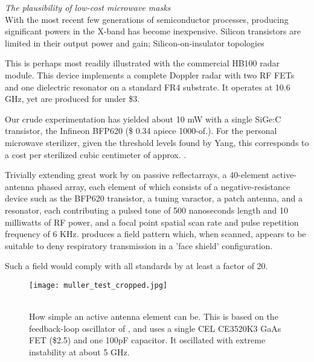 \documentclass[paper.tex]{subfiles}
\begin{document}
%
%
%
{\Large \it The plausibility of low-cost microwave masks}\\

With the most recent few generations of semiconductor processes, producing significant powers in the X-band has become inexpensive. Silicon transistors are limited in their output power and gain; Silicon-on-insulator topologies 

This is perhaps most readily illustrated with the commercial HB100 radar module. This device implements a complete Doppler radar with two RF FETs and one dielectric resonator on a standard FR4 substrate. It operates at 10.6 GHz, yet are produced for under \$3.

Our crude experimentation has yielded about 10 mW with a single SiGe:C transistor, the Infineon BFP620 (\$ 0.34 apiece \@ 1000-of.). For the personal microwave sterilizer, given the threshold levels found by Yang, this corresponds to a cost per sterilized cubic centimeter of approx. \cite{BFP620H7764XTSA1}.




Trivially extending great work by \cite{Focusing} on passive reflectarrays, a 40-element active-antenna phased array, each element of which consists of a negative-resistance device such as the BFP620 transistor, a tuning varactor, a patch antenna, and a resonator, each contributing a pulsed tone of 500 nanoseconds length and 10 milliwatts of RF power, and a focal point spatial scan rate and pulse repetition frequency of 6 KHz. produces a field pattern which, when scanned, appears to be suitable to deny respiratory transmission in a 'face shield' configuration. 

Such a field would comply with all standards by at least a factor of 20.


\begin{figure}[H]
	\captionsetup{singlelinecheck = false, justification=justified}
	\centering
	\texttt{[image: muller\_test\_cropped.jpg]}
	\caption{\\ How simple an active antenna element can be. This is based on the feedback-loop oscillator of \cite{SmallSize2008}, and uses a single CEL CE3520K3 GaAs FET (\$2.5) and one 100pF capacitor. It oscillated with extreme instability at about 5 GHz.}
\end{figure}
\end{document}
